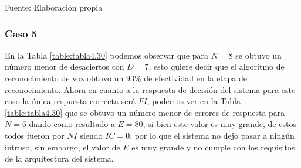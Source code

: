 \begin{center}
\begin{table}[H]
\centering
\caption{\small{Resultados para el caso 4 con U1 estático.}}
\label{table:tabla4.29}
\vskip 0.2cm
\begin{center}
\vskip 0.2cm
{\small{Fuente: Elaboración propia}}
\end{center}
\end{table}
\end{center}

\subsubsection{Caso 5}
En la Tabla \ref{table:tabla4.30} podemos observar que para $N = 8$ se obtuvo un número menor de desaciertos con $D = 7$, esto quiere decir que el algoritmo de reconocimiento de voz obtuvo un 93\% de efectividad en la etapa de reconocimiento.
\vskip 0.5cm
Ahora en cuanto a la respuesta de decisión del sistema para este caso la única respuesta correcta será $FI$, podemos ver en la Tabla \ref{table:tabla4.30} que se obtuvo un número menor de errores de respuesta para $N = 6$ dando como resultado a $E = 80$, si bien este valor es muy grande, de estos todos fueron por $NI$ siendo $IC = 0$, por lo que el sistema no dejo pasar a ningún intruso, sin embargo, el valor de $E$ es muy grande y no cumple con los requisitos de la arquitectura del sistema.

